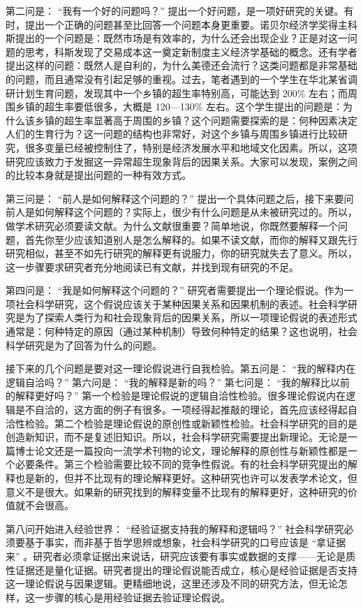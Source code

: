 第二问是： “我有一个好的问题吗？” 提出一个好问题，是一项好研究的关键。有时，提出一个正确的问题甚至比回答一个问题本身更重要。诺贝尔经济学奖得主科斯提出的一个问题是：既然市场是有效率的，为什么还会出现企业？正是对这一问题的思考，科斯发现了交易成本这一奠定新制度主义经济学基础的概念。还有学者提出这样的问题：既然人是自利的，为什么美德还会流行？这类问题都是非常基础的问题，而且通常没有引起足够的重视。过去，笔者遇到的一个学生在华北某省调研计划生育问题，发现其中一个乡镇的超生率特别高，可能达到 200\% 左右；而周围乡镇的超生率要低很多，大概是 120—130\% 左右。这个学生提出的问题是：为什么该乡镇的超生率显著高于周围的乡镇？这个问题需要探索的是：何种因素决定人们的生育行为？这一问题的结构也非常好，对这个乡镇与周围乡镇进行比较研究，很多变量已经被控制住了，特别是经济发展水平和地域文化因素。所以，这项研究应该致力于发掘这一异常超生现象背后的因果关系。大家可以发现，案例之间的比较本身就是提出问题的一种有效方式。

第三问是： “前人是如何解释这个问题的？” 提出一个具体问题之后，接下来要问前人是如何解释这个问题的？实际上，很少有什么问题是从未被研究过的。所以，做学术研究必须要读文献。为什么文献很重要？简单地说，你既然要解释一个问题，首先你至少应该知道别人是怎么解释的。如果不读文献，而你的解释又跟先行研究相似，甚至不如先行研究的解释更有说服力，你的研究就失去了意义。所以，这一步骤要求研究者充分地阅读已有文献，并找到现有研究的不足。

第四问是： “我是如何解释这个问题的？” 研究者需要提出一个理论假说。作为一项社会科学研究，这个假说应该关于某种因果关系和因果机制的表述。社会科学研究是为了探索人类行为和社会现象背后的因果关系，所以一项理论假说的表述形式通常是：何种特定的原因（通过某种机制）导致何种特定的结果？这也说明，社会科学研究是为了回答为什么的问题。

接下来的几个问题是要对这一理论假说进行自我检验。第五问是： “我的解释内在逻辑自洽吗？” 第六问是： “我的解释是新的吗？” 第七问是： “我的解释比以前的解释更好吗？” 第一个检验是理论假说的逻辑自洽性检验。很多理论假说内在逻辑是不自洽的，这方面的例子有很多。一项经得起推敲的理论，首先应该经得起自洽性检验。第二个检验是理论假说的原创性或新颖性检验。社会科学研究的目的是创造新知识，而不是复述旧知识。所以，社会科学研究需要提出新理论。无论是一篇博士论文还是一篇投向一流学术刊物的论文，理论解释的原创性与新颖性都是一个必要条件。第三个检验需要比较不同的竞争性假说。有的社会科学研究提出的解释也是新的，但并不比现有的理论解释更好。这种研究也许可以发表学术论文，但意义不是很大。如果新的研究找到的解释变量不比现有的解释更好，这种研究的价值就不会很高。

第八问开始进入经验世界： “经验证据支持我的解释和逻辑吗？” 社会科学研究必须要基于事实，而非基于哲学思辨或想象，社会科学研究的口号应该是 “拿证据来” 。研究者必须拿证据出来说话，研究应该要有事实或数据的支撑——无论是质性证据还是量化证据。研究者提出的理论假说能否成立，核心是经验证据是否支持这一理论假说与因果逻辑。更精细地说，这里还涉及不同的研究方法，但无论怎样，这一步骤的核心是用经验证据去验证理论假说。

